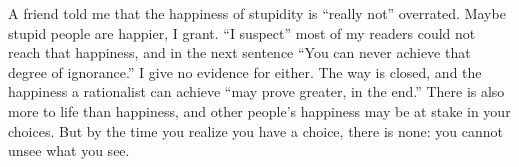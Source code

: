 A friend told me that the happiness of stupidity is ``really not'' overrated. Maybe stupid people are happier, I grant. ``I suspect'' most of my readers could not reach that happiness, and in the next sentence ``You can never achieve that degree of ignorance.'' I give no evidence for either. The way is closed, and the happiness a rationalist can achieve ``may prove greater, in the end.'' There is also more to life than happiness, and other people's happiness may be at stake in your choices. But by the time you realize you have a choice, there is none: you cannot unsee what you see.
